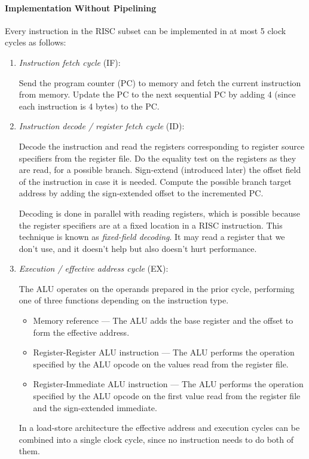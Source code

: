 \documentclass[12pt, a4paper]{article}
\theoremstyle{margin}
\begin{document}
      \paragraph{Implementation Without Pipelining\cite{caqa}} 
        Every instruction in the RISC subset can be implemented in at most 5 clock cycles as follows:
        \begin{enumerate}
          \item \emph{Instruction fetch cycle} (IF):

          Send the program counter (PC) to memory and fetch the current instruction from memory. Update the PC to the next sequential PC by adding 4 (since each instruction is 4 bytes) to the PC.

          \item \emph{Instruction decode / register fetch cycle} (ID):

          Decode the instruction and read the registers corresponding to register source specifiers from the register file. Do the equality test on the registers as they are read, for a possible branch. Sign-extend (introduced later) the offset field of the instruction in case it is needed. Compute the possible branch target address by adding the sign-extended offset to the incremented PC.

          Decoding is done in parallel with reading registers, which is possible because the register specifiers are at a fixed location in a RISC instruction. This technique is known as \emph{fixed-field decoding}. It may read a register that we don't use, and it doesn't help but also doesn't hurt performance.

          \item \emph{Execution / effective address cycle} (EX):

          The ALU operates on the operands prepared in the prior cycle, performing one of three functions depending on the instruction type.
          \begin{itemize}
            \item Memory reference --- The ALU adds the base register and the offset to form the effective address.
            \item Register-Register ALU instruction --- The ALU performs the operation specified by the ALU opcode on the values read from the register file.
            \item Register-Immediate ALU instruction --- The ALU performs the operation specified by the ALU opcode on the first value read from the register file and the sign-extended immediate.
          \end{itemize}

          In a load-store architecture the effective address and execution cycles can be combined into a single clock cycle, since no instruction needs to do both of them.
        \end{enumerate}
\end{document}
